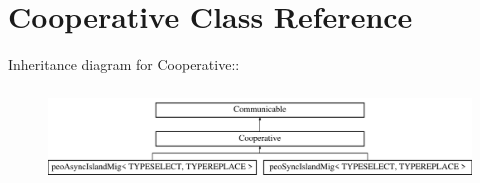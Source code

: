 \hypertarget{classCooperative}{
\section{Cooperative Class Reference}
\label{classCooperative}
}
Inheritance diagram for Cooperative::\begin{figure}[H]
\begin{center}
\leavevmode
\includegraphics[height=2.53012cm]{classCooperative}
\end{center}
\end{figure}
